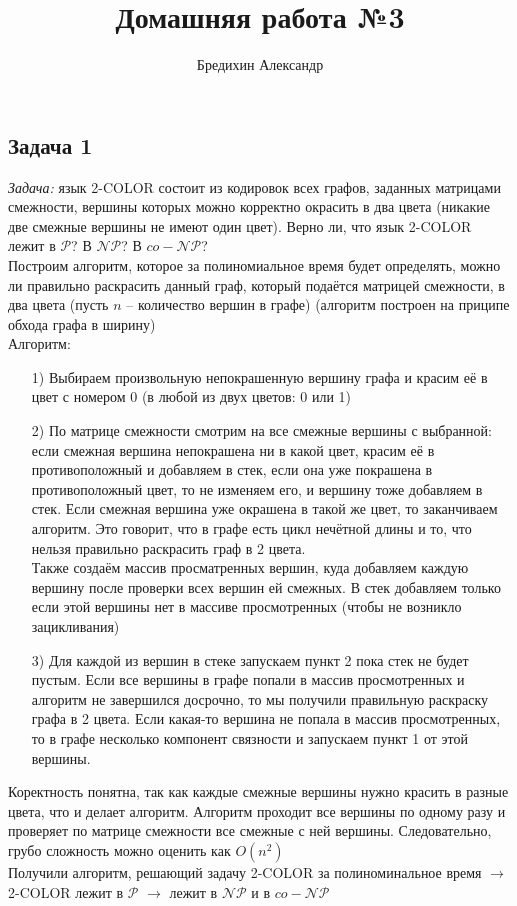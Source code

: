 \documentclass[a4paper,12pt]{article} %
\author{Бредихин Александр}
\title{Домашняя работа №3}
\begin{document}

\maketitle

\subsection*{Задача 1}
\textit{Задача:} язык 2-COLOR состоит из кодировок всех графов, заданных матрицами смежности, вершины которых можно корректно окрасить в два цвета (никакие две смежные вершины не имеют один цвет). Верно ли, что язык 2-COLOR лежит в $\mathcal{P}$? В $\mathcal{NP}$? В $co-\mathcal{NP}$?\\

Построим алгоритм, которое за полиномиальное время будет определять, можно ли правильно раскрасить данный граф, который подаётся матрицей смежности, в два цвета (пусть $ n $ -- количество вершин в графе) (алгоритм построен на приципе обхода графа в ширину)\\

Алгоритм: 
\begin{itemize}
\item[1)] Выбираем произвольную непокрашенную вершину графа и красим её в цвет с номером $ 0 $ (в любой из двух цветов: 0 или 1)
\item[2)] По матрице смежности смотрим на все смежные вершины с выбранной: если смежная вершина непокрашена ни в какой цвет, красим её в противоположный и добавляем в стек, если она уже покрашена в противоположный цвет, то не изменяем его, и вершину тоже добавляем в стек. Если смежная вершина уже окрашена в такой же цвет, то заканчиваем алгоритм. Это говорит, что в графе есть цикл нечётной длины и то, что нельзя правильно раскрасить граф в 2 цвета.\\
Также создаём массив просматренных вершин, куда добавляем каждую вершину после проверки всех вершин ей смежных. В стек добавляем только если этой вершины нет в массиве просмотренных (чтобы не возникло зацикливания)
\item[3)] Для каждой из вершин в стеке запускаем пункт 2 пока стек не будет пустым. Если все вершины в графе попали в массив просмотренных и алгоритм не завершился досрочно, то мы получили правильную раскраску графа в 2 цвета. Если какая-то вершина не попала в массив просмотренных, то в графе несколько компонент связности и запускаем пункт 1 от этой вершины.
\end{itemize}
Коректность понятна, так как каждые смежные вершины нужно красить в разные цвета, что и делает алгоритм. Алгоритм проходит все вершины по одному разу и проверяет по матрице смежности все смежные с ней вершины. Следовательно, грубо сложность можно оценить как $ O(n^2) $\\
Получили алгоритм, решающий задачу 2-COLOR за полиноминальное время $ \longrightarrow $ 2-COLOR лежит в $\mathcal{P}$ $ \longrightarrow $ лежит в $\mathcal{NP}$ и в $co-\mathcal{NP}$
\end{document}
